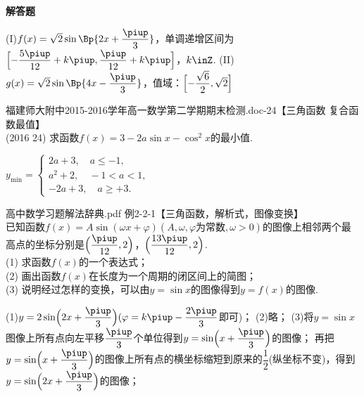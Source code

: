 \begin{exercise}{\bf 解答题}
\begin{minipage}[h]{0.3\linewidth}
\begin{center}
        \end{center}
      \end{minipage}
      \begin{answer}
        (I)$f(x)=\sqrt2\sin\Bp{2x+\dfrac{\piup}3}$，单调递增区间为$\Bigl[-\dfrac{5\piup}{12}+k\piup,\dfrac{\piup}{12}+k\piup\Bigr]$，$k\inZ$.
        (II)$g(x)=\sqrt2\sin\Bp{4x-\dfrac{\piup}3}$，值域：$\Bigl[-\dfrac{\sqrt6}2,\sqrt2\Bigr]$
      \end{answer}
    \item 福建师大附中2015-2016学年高一数学第二学期期末检测.doc-24【三角函数 复合函数最值】\\
      (2016  24)
      求函数$f(x)=3-2a\sin x-\cos^2x$的最小值.
      \begin{answer}
        $y_{\min}=\begin{cases}
          2a+3,\quad a\leqslant-1,\\
          a^2+2,\quad -1<a<1,\\
          -2a+3,\quad a\geqslant+3.
        \end{cases}$
      \end{answer}
    \item 高中数学习题解法辞典.pdf 例2-2-1【三角函数，解析式，图像变换】\\
      已知函数$f(x)=A\sin(\omega x+\varphi)(A,\omega,\varphi\text{为常数},\omega>0)$的图像上相邻两个最高点的坐标分别是$\Bigl(\dfrac{\piup}{12},2\Bigr)$，$\Bigl(\dfrac{13\piup}{12},2\Bigr)$.\\
      (1) 求函数$f(x)$的一个表达式；\\
      (2) 画出函数$f(x)$在长度为一个周期的闭区间上的简图；\\
      (3) 说明经过怎样的变换，可以由$y=\sin x$的图像得到$y=f(x)$的图像.
      \begin{answer}
        (1)$y=2\sin\Bigl(2x+\dfrac{\piup}3\Bigr)(\varphi=k\piup-\dfrac{2\piup}3$即可)；
        (2)略；
        (3)将$y=\sin x$图像上所有点向左平移$\dfrac{\piup}3$个单位得到$y=\sin \Bigl(x+\dfrac{\piup}3\Bigr)$的图像；
        再把$y=\sin \Bigl(x+\dfrac{\piup}3\Bigr)$的图像上所有点的横坐标缩短到原来的$\dfrac12$(纵坐标不变)，得到$y=\sin \Bigl(2x+\dfrac{\piup}3\Bigr)$的图像；

\end{answer}
\end{exercise}
